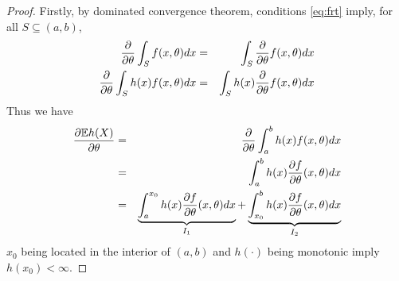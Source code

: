 \documentclass[11pt,a4]{amsart}
\newcommand{\pd}{\partial}
\newcommand{\E }{{\mathbb E}}
\newcommand{\1}{{\mathbf 1}}
\begin{document}
\begin{proof}
  Firstly, by dominated convergence theorem, conditions \eqref{eq:frt}
  imply, for all $S \subseteq (a, b)$,
  \begin{eqnarray*}
    {\pd \over \pd \theta}\int_S f(x, \theta) dx
    &=&
    \int_S {\pd \over \pd \theta} f(x, \theta) dx \\
    {\pd \over \pd \theta}\int_S h(x) f(x, \theta) dx
    &=&
    \int_S h(x) {\pd \over \pd \theta} f(x, \theta) dx \\
  \end{eqnarray*}
  Thus we have
  \begin{eqnarray*}
    {\pd \E h(X) \over \pd \theta}
    &=&
    {\pd \over \pd \theta}
    \int_a^b h(x)
    f(x, \theta) dx \\
    &=& \int_a^b h(x)
    {\pd f \over \pd \theta}(x, \theta) dx \\
    &=& \underbrace{\int_a^{x_0}
      h(x) {\pd f \over \pd \theta}(x, \theta) dx}_{I_1}
    + \underbrace{\int_{x_0}^b
      h(x) {\pd f \over \pd \theta}(x,
      \theta) dx}_{I_2}
  \end{eqnarray*}
  $x_0$ being located in the interior of $(a, b)$ and
  $h(\cdot)$ being monotonic imply $h(x_0) < \infty$.

\end{proof}
\end{document}
